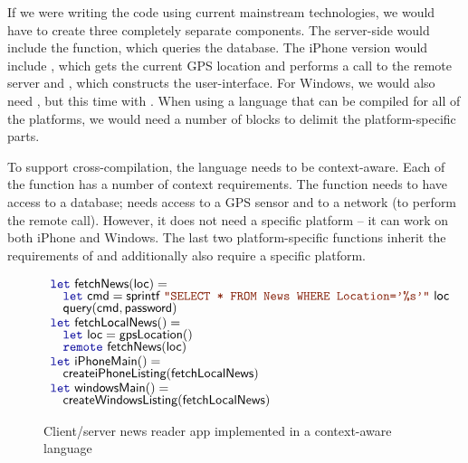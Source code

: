 If we were writing the code using current mainstream technologies, we would have to create three
completely separate components. The server-side would include the  function, which
queries the database. The iPhone version would include , which gets the current
GPS location and performs a call to the remote server and , which constructs the
user-interface. For Windows, we would also need , but this time with
. When using a language that can be compiled for all of the platforms, we would need
a number of  blocks to delimit the platform-specific parts.

To support cross-compilation, the language needs to be context-aware. Each of the function has a
number of context requirements. The  function needs to have access to a database;
 needs access to a GPS sensor and to a network (to perform the remote call).
However, it does not need a specific platform -- it can work on both iPhone and Windows. The last
two platform-specific functions inherit the requirements of  and additionally
also require a specific platform.



\begin{figure}
\begin{equation*}
\begin{array}{l}
\kvd{let}~\ident{fetchNews}(\ident{loc}) =\\[-0.25em]
\hspace{1em} \kvd{let}~\ident{cmd} = \ident{sprintf}~\str{SELECT * FROM News WHERE Location='\%s'}~\ident{loc}\\[-0.25em]
\hspace{1em} \ident{query}(\ident{cmd}, \ident{password})\\[-0.25em]
\\[-1.0em]
\kvd{let}~\ident{fetchLocalNews}() =\\[-0.25em]
\hspace{1em} \kvd{let}~\ident{loc} = \ident{gpsLocation}()\\[-0.25em]
\hspace{1em} \kvd{remote}~\ident{fetchNews}(\ident{loc})\\[-0.25em]
\\[-1.0em]
\kvd{let}~\ident{iPhoneMain}() = \\[-0.25em]
\hspace{1em} \ident{createiPhoneListing}(\ident{fetchLocalNews})\\[-0.25em]
\\[-1.0em]
\kvd{let}~\ident{windowsMain}() = \\[-0.25em]
\hspace{1em} \ident{createWindowsListing}(\ident{fetchLocalNews})
\end{array}
\end{equation*}

\caption{Client/server news reader app implemented in a context-aware language}
\label{fig:introduction-sample}
\end{figure}

